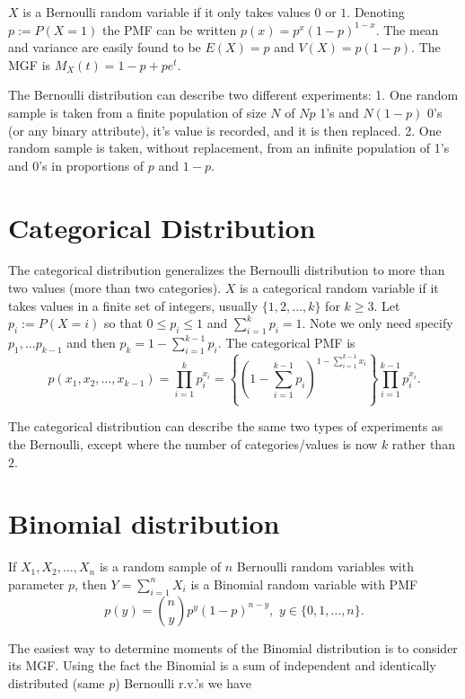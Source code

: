 \documentclass[]{book}
\begin{document}
\(X\) is a Bernoulli random variable if it only takes values \(0\) or
\(1\). Denoting \(p:=P(X=1)\) the PMF can be written
\(p(x) = p^x(1-p)^{1-x}\). The mean and variance are easily found to be
\(E(X) = p\) and \(V(X) = p(1-p)\). The MGF is \(M_X(t) = 1-p+pe^t\).

The Bernoulli distribution can describe two different experiments: 1.
One random sample is taken from a finite population of size \(N\) of
\(Np\) 1's and \(N(1-p)\) 0's (or any binary attribute), it's value is
recorded, and it is then replaced. 2. One random sample is taken,
without replacement, from an infinite population of 1's and 0's in
proportions of \(p\) and \(1-p\).

\section{Categorical Distribution}\label{categorical-distribution}

The categorical distribution generalizes the Bernoulli distribution to
more than two values (more than two categories). \(X\) is a categorical
random variable if it takes values in a finite set of integers, usually
\(\{1,2,\ldots,k\}\) for \(k\geq 3\). Let \(p_i:=P(X=i)\) so that
\(0\leq p_i\leq 1\) and \(\sum_{i=1}^k p_i = 1\). Note we only need
specify \(p_1,\ldots p_{k-1}\) and then
\(p_k = 1- \sum_{i=1}^{k-1}p_i\). The categorical PMF is
\[p(x_1,x_2,\ldots,x_{k-1}) = \prod_{i=1}^{k} p_i^{x_i} = \left\{(1-\sum_{i=1}^{k-1} p_i)^{1-\sum_{i=1}^{k-1} x_i}\right\} \prod_{i=1}^{k-1} p_i^{x_i}.\]

The categorical distribution can describe the same two types of
experiments as the Bernoulli, except where the number of
categories/values is now \(k\) rather than \(2\).

\section{Binomial distribution}\label{binomial-distribution}

If \(X_1,X_2,\ldots, X_n\) is a random sample of \(n\) Bernoulli random
variables with parameter \(p\), then \(Y = \sum_{i=1}^n X_i\) is a
Binomial random variable with PMF
\[p(y) = {n \choose y}p^y(1-p)^{n-y}, \,\, y\in \{0, 1,\ldots, n\}.\]

The easiest way to determine moments of the Binomial distribution is to
consider its MGF. Using the fact the Binomial is a sum of independent
and identically distributed (same \(p\)) Bernoulli r.v.'s we have
\end{document}
